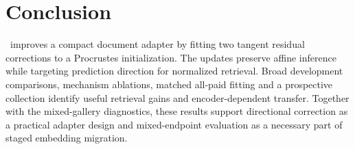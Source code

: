 \section{Conclusion}
\method\ improves a compact document adapter by fitting two tangent residual corrections to a Procrustes initialization. The updates preserve affine inference while targeting prediction direction for normalized retrieval. Broad development comparisons, mechanism ablations, matched all-paid fitting and a prospective collection identify useful retrieval gains and encoder-dependent transfer. Together with the mixed-gallery diagnostics, these results support directional correction as a practical adapter design and mixed-endpoint evaluation as a necessary part of staged embedding migration.

